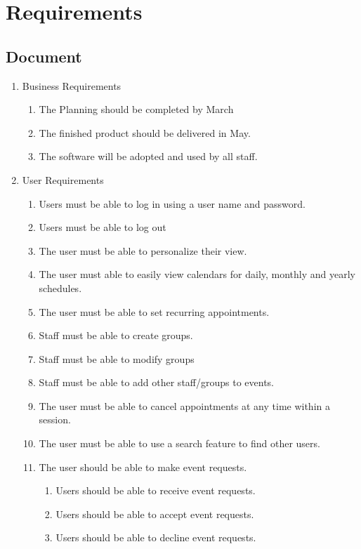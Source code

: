 \documentclass[a4paper]{article}
\begin{document}
\section{Requirements}

\subsection{Document} %

\begin{enumerate}
  \item Business Requirements
  \begin{enumerate}[label=B\arabic*.]
    \item The Planning should be completed by March 
    \item The finished product should be delivered in May.
    \item The software will be adopted and used by all staff.
  \end{enumerate}

  \item User Requirements
  \begin{enumerate}[label=U\arabic*.] 
    \item Users must be able to log in using a user name and password.
    \item Users must be able to log out
    \item The user must be able to personalize their view.
    \item The user must able to easily view calendars for daily, monthly and yearly schedules.
    \item The user must be able to set recurring appointments.
    \item Staff must be able to create groups.
    \item Staff must be able to modify groups
    \item Staff must be able to add other staff/groups to events.
    \item The user must be able to cancel appointments at any time within a session.
    \item The user must be able to use a search feature to find other users.
    \item The user should be able to make event requests. 
    \begin{enumerate}[label*=\arabic*.]
      \item Users should be able to receive event requests.
      \item Users should be able to accept event requests.
      \item Users should be able to decline event requests.
    \end{enumerate}
  \end{enumerate}


\end{enumerate}
\end{document}
